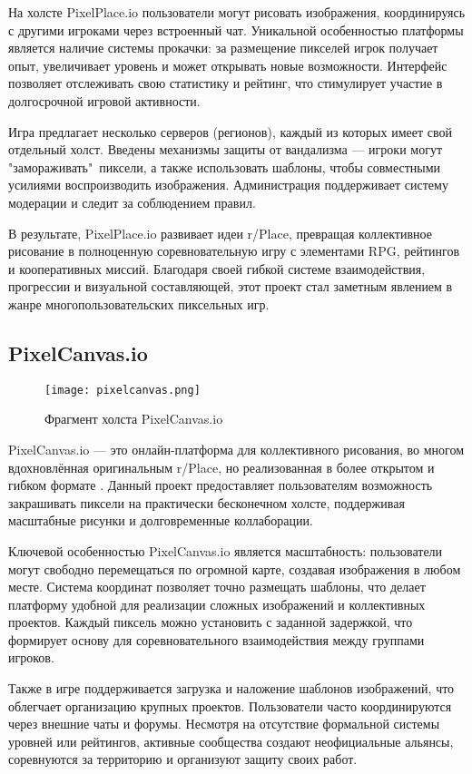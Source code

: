 На холсте PixelPlace.io пользователи могут рисовать изображения, координируясь с другими игроками через встроенный чат. Уникальной особенностью платформы является наличие системы прокачки: за размещение пикселей игрок получает опыт, увеличивает уровень и может открывать новые возможности. Интерфейс позволяет отслеживать свою статистику и рейтинг, что стимулирует участие в долгосрочной игровой активности.

Игра предлагает несколько серверов (регионов), каждый из которых имеет свой отдельный холст. Введены механизмы защиты от вандализма --- игроки могут "замораживать"\ пиксели, а также использовать шаблоны, чтобы совместными усилиями воспроизводить изображения. Администрация поддерживает систему модерации и следит за соблюдением правил.

В результате, PixelPlace.io развивает идеи r/Place, превращая коллективное рисование в полноценную соревновательную игру с элементами RPG, рейтингов и кооперативных миссий. Благодаря своей гибкой системе взаимодействия, прогрессии и визуальной составляющей, этот проект стал заметным явлением в жанре многопользовательских пиксельных игр.

\subsection{PixelCanvas.io}

\begin{figure}[H]
    \texttt{[image: pixelcanvas.png]}
    \caption{Фрагмент холста PixelCanvas.io}
\end{figure}

PixelCanvas.io --- это онлайн-платформа для коллективного рисования, во многом вдохновлённая оригинальным r/Place, но реализованная в более открытом и гибком формате \cite{pixelcanvas}. Данный проект предоставляет пользователям возможность закрашивать пиксели на практически бесконечном холсте, поддерживая масштабные рисунки и долговременные коллаборации.

Ключевой особенностью PixelCanvas.io является масштабность: пользователи могут свободно перемещаться по огромной карте, создавая изображения в любом месте. Система координат позволяет точно размещать шаблоны, что делает платформу удобной для реализации сложных изображений и коллективных проектов. Каждый пиксель можно установить с заданной задержкой, что формирует основу для соревновательного взаимодействия между группами игроков.

Также в игре поддерживается загрузка и наложение шаблонов изображений, что облегчает организацию крупных проектов. Пользователи часто координируются через внешние чаты и форумы. Несмотря на отсутствие формальной системы уровней или рейтингов, активные сообщества создают неофициальные альянсы, соревнуются за территорию и организуют защиту своих работ.

